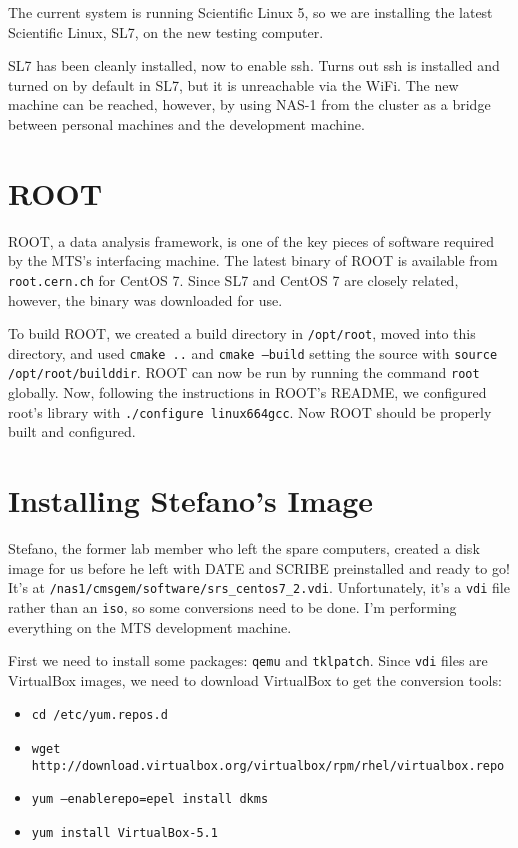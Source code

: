 \documentclass[12pt]{article}
\begin{document}
\qq The current system is running Scientific Linux 5, so we are
installing the latest Scientific Linux, SL7, on the new testing computer. 

\qq SL7 has been cleanly installed, now to enable ssh. Turns out ssh is
installed and turned on by default in SL7, but it is unreachable via the
WiFi. The new machine can be reached, however, by using NAS-1 from the cluster
as a bridge between personal machines and the development machine.

\section{ROOT}

\qq ROOT, a data analysis framework, is one of the key pieces of software
required by the MTS's interfacing machine. The latest binary of ROOT is
available from {\tt root.cern.ch} for CentOS 7. Since SL7 and CentOS 7 are
closely related, however, the binary was downloaded for use.

\qq To build ROOT, we created a build directory in {\tt /opt/root}, moved into
this directory, and used {\tt cmake ..} and {\tt cmake --build} setting the
source with {\tt source /opt/root/builddir}. ROOT can now be run by running the
command {\tt root} globally. Now, following the instructions in ROOT's README,
we configured root's library with {\tt ./configure linux664gcc}. Now ROOT should
be properly built and configured.

\section{Installing Stefano's Image}

\qq Stefano, the former lab member who left the spare computers, created a disk
image for us before he left with DATE and SCRIBE preinstalled and ready to go!
It's at {\tt /nas1/cmsgem/software/srs\_centos7\_2.vdi}. Unfortunately, it's a
{\tt vdi} file rather than an {\tt iso}, so some conversions need to be
done. I'm performing everything on the MTS development machine.

\qq First we need to install some packages: {\tt qemu} and {\tt tklpatch}.
Since {\tt vdi} files are VirtualBox images, we need to download VirtualBox to
get the conversion tools:

\begin{itemize}
  \item {\tt cd /etc/yum.repos.d}
  \item {\tt wget
      http://download.virtualbox.org/virtualbox/rpm/rhel/virtualbox.repo}
  \item {\tt yum --enablerepo=epel install dkms}
  \item {\tt yum install VirtualBox-5.1}
\end{itemize}
\end{document}
